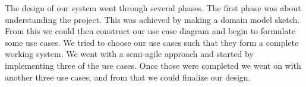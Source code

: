 The design of our system went through several phases. The first phase was about understanding the project. This was achieved by making a domain model sketch. From this we could then construct our use case diagram and begin to formulate some use cases. We tried to choose our use cases such that they form a complete working system. We went with a semi-agile approach and started by implementing three of the use cases. Once those were completed we went on with another three use cases, and from that we could finalize our design. 